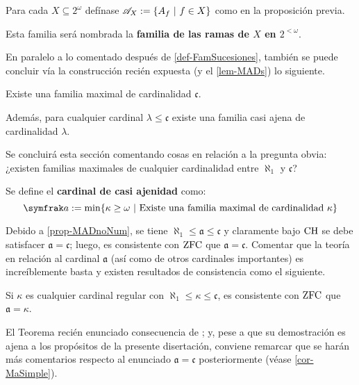  \begin{definicion}\label{def-FamRamas}
  Para cada $X \subseteq 2^\omega$ defínase $\mathscr{A}_X:=\{A_f \text{ $|$ } f \in X\}$ como en la proposición previa.

  Esta familia será nombrada la \textbf{familia de las ramas de $X$ en $2^{<\omega}$}.
 \end{definicion}

 En paralelo a lo comentado después de \ref{def-FamSucesiones}, también se puede concluir vía la construcción recién expuesta (y el \autoref{lem-MADs}) lo siguiente.

 \begin{corolario}\label{cor-famGrandes}
  Existe una familia maximal de cardinalidad $\mathfrak{c}$.

  Además, para cualquier cardinal $\lambda \leq \mathfrak{c}$ existe una familia casi ajena de cardinalidad $\lambda$.
 \end{corolario}

 Se concluirá esta sección comentando cosas en relación a la pregunta obvia: ¿existen familias maximales de cualquier cardinalidad entre $\aleph_1$ y $\mathfrak{c}$?

 \begin{definicion}
  Se define el \textbf{cardinal de casi ajenidad} como: 
  $$ \mathfrak{a}:=\min\{ \kappa \geq \omega \tq \text{Existe una familia maximal de cardinalidad } \kappa \} $$
 \end{definicion}

 Debido a \ref{prop-MADnoNum}, se tiene $\aleph_1 \leq \mathfrak{a} \leq \mathfrak{c}$ y claramente bajo $\operatorname{CH}$ se debe satisfacer $\mathfrak{a}=\mathfrak{c}$; luego, es consistente con $\operatorname{ZFC}$ que $\mathfrak{a}=\mathfrak{c}$. Comentar que la teoría en relación al cardinal $\mathfrak{a}$ (así como de otros cardinales importantes) es increíblemente basta y existen resultados de consistencia como el siguiente.

 \begin{teorema}\label{teo-stafa}
  Si $\kappa$ es cualquier cardinal regular con $\aleph_1 \leq \kappa \leq \mathfrak{c}$, es consistente con $\operatorname{ZFC}$ que $\mathfrak{a}=\kappa$.
 \end{teorema}

 El Teorema recién enunciado consecuencia de \cite[Teo.~5.1, p.~127]{kunenHandbook}; y, pese a que su demostración es ajena a los propósitos de la presente disertación, conviene remarcar que se harán más comentarios respecto al enunciado $\mathfrak{a}=\mathfrak{c}$ posteriormente (véase \ref{cor-MaSimple}).

